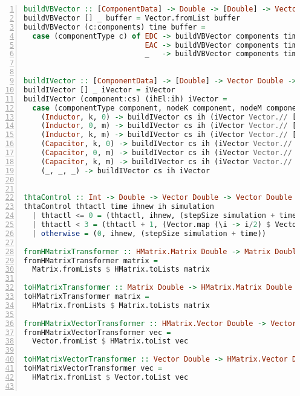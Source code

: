\begin{lstlisting}[language=Haskell, numbers=left, caption={Main.hs file code}, captionpos=b, label={lst:maincompletecode}]
buildVBVector :: [ComponentData] -> Double -> [Double] -> Vector Double
buildVBVector [] _ buffer = Vector.fromList buffer
buildVBVector (c:components) time buffer =
  case (componentType c) of EDC -> buildVBVector components time ((magnitude c) : buffer)
                            EAC -> buildVBVector components time (((magnitude c * cos (2 * pi * param2 c * time + (param1 c * (pi/180))))) : buffer)
                            _   -> buildVBVector components time buffer


buildIVector :: [ComponentData] -> [Double] -> Vector Double -> Vector Double
buildIVector [] _ iVector = iVector
buildIVector (component:cs) (ihEl:ih) iVector =
  case (componentType component, nodeK component, nodeM component) of 
    (Inductor, k, 0) -> buildIVector cs ih (iVector Vector.// [((k - 1), ((iVector Vector.! (k-1)) + ihEl))])
    (Inductor, 0, m) -> buildIVector cs ih (iVector Vector.// [((m - 1), ((iVector Vector.! (m-1)) - ihEl))])
    (Inductor, k, m) -> buildIVector cs ih (iVector Vector.// [((m - 1), ((iVector Vector.! (m-1)) - ihEl)), ((k-1), ((iVector Vector.! (k-1)) + ihEl))])
    (Capacitor, k, 0) -> buildIVector cs ih (iVector Vector.// [((k - 1), ((iVector Vector.! (k-1)) + ihEl))])
    (Capacitor, 0, m) -> buildIVector cs ih (iVector Vector.// [((m - 1), ((iVector Vector.! (m-1)) - ihEl))])
    (Capacitor, k, m) -> buildIVector cs ih (iVector Vector.// [((m - 1), ((iVector Vector.! (m-1)) - ihEl)), ((k-1), ((iVector Vector.! (k-1)) + ihEl))])
    (_, _, _) -> buildIVector cs ih iVector


thtaControl :: Int -> Double -> Vector Double -> Vector Double -> SimulationData -> (Int, Vector Double, Double)
thtaControl thtactl time ihnew ih simulation
  | thtactl <= 0 = (thtactl, ihnew, (stepSize simulation + time))
  | thtactl < 3 = (thtactl + 1, (Vector.map (\i -> i/2) $ Vector.zipWith (+) ih ihnew), (time + (stepSize simulation/2)))
  | otherwise = (0, ihnew, (stepSize simulation + time))

fromHMatrixTransformer :: HMatrix.Matrix Double -> Matrix Double
fromHMatrixTransformer matrix =
  Matrix.fromLists $ HMatrix.toLists matrix

toHMatrixTransformer :: Matrix Double -> HMatrix.Matrix Double
toHMatrixTransformer matrix =
  HMatrix.fromLists $ Matrix.toLists matrix

fromHMatrixVectorTransformer :: HMatrix.Vector Double -> Vector Double
fromHMatrixVectorTransformer vec =
  Vector.fromList $ HMatrix.toList vec

toHMatrixVectorTransformer :: Vector Double -> HMatrix.Vector Double
toHMatrixVectorTransformer vec =
  HMatrix.fromList $ Vector.toList vec


\end{lstlisting}
